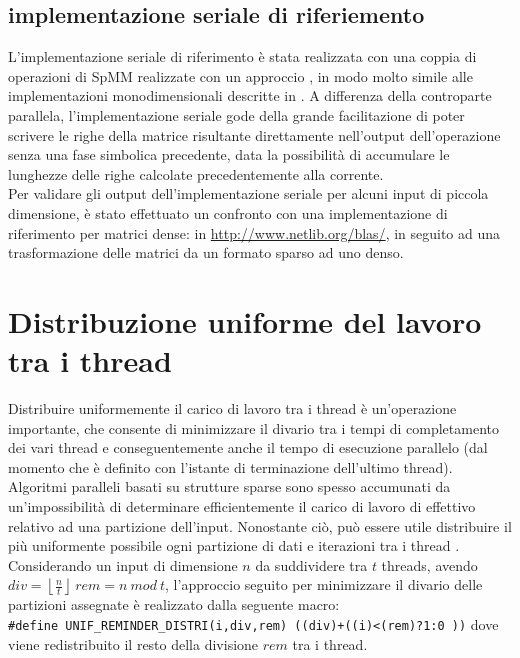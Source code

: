 \subsection{implementazione seriale di riferiemento}	\label{implSerialeRiferimento}
L'implementazione seriale di riferimento è stata realizzata con una coppia di operazioni di SpMM
realizzate con un approccio \rowbyrow, in modo molto simile alle implementazioni monodimensionali descritte in .
A differenza della controparte parallela, l'implementazione seriale gode della grande facilitazione 
di poter scrivere le righe della matrice risultante direttamente nell'output dell'operazione senza una fase simbolica precedente,
data la possibilità di accumulare le lunghezze delle righe calcolate precedentemente alla corrente.\\
\voidLine
Per validare gli output dell'implementazione seriale per alcuni input di piccola dimensione,
è stato effettuato un confronto con una implementazione di riferimento per matrici dense:  in \url{http://www.netlib.org/blas/},
in seguito ad una trasformazione delle matrici da un formato sparso ad uno denso.\\

\section{Distribuzione uniforme del lavoro tra i thread}	\label{chSpMMAux:UNIF_REMINDER_DISTRI}
Distribuire uniformemente il carico di lavoro tra i thread è un'operazione importante,
che consente di minimizzare il divario tra i tempi di completamento dei vari thread 
e conseguentemente anche il tempo di esecuzione parallelo
(dal momento che è definito con l'istante di terminazione dell'ultimo thread).\\

Algoritmi paralleli basati su strutture sparse sono spesso accumunati da 
un'impossibilità di determinare efficientemente il carico di lavoro di effettivo
relativo ad una partizione dell'input.
Nonostante ciò, può essere utile distribuire il più uniformente possibile ogni partizione 
di dati e iterazioni tra i thread .\\%
Considerando un input di dimensione $n$ da suddividere tra $t$ threads, avendo\\
$div=\left\lfloor \frac{n}{t}  \right\rfloor ~ rem=n ~mod ~t$,
l'approccio seguito per minimizzare il divario delle partizioni assegnate %
è realizzato dalla seguente macro:\\
\verb|#define UNIF_REMINDER_DISTRI(i,div,rem) ((div)+((i)<(rem)?1:0 ))|
dove viene redistribuito il resto della divisione $rem$ tra i thread.\\
